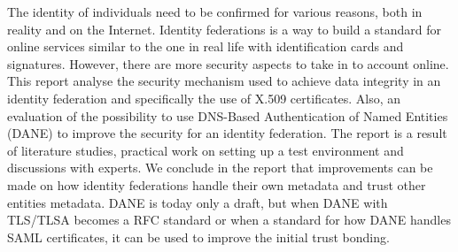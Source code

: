 The identity of individuals need to be confirmed for various reasons, both in reality and on the Internet. 
Identity federations is a way to build a standard for online services similar to the one in real life with identification cards and signatures.
However, there are more security aspects to take in to account online.
This report analyse the security mechanism used to achieve data integrity in an identity federation and specifically the use of X.509 certificates.
Also, an evaluation of the possibility to use DNS-Based Authentication of Named Entities (DANE) to improve the security for an identity federation.
The report is a result of literature studies, practical work on setting up a test environment and discussions with experts.
We conclude in the report that improvements can be made on how identity federations handle their own metadata and trust other entities metadata. 
DANE is today only a draft, but when DANE with TLS/TLSA becomes a RFC standard or when a standard for how DANE handles SAML certificates, it can be used to improve the initial trust bonding.








